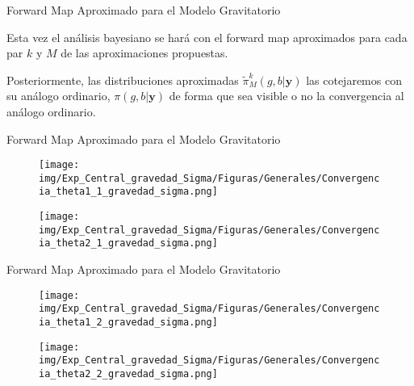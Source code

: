 \documentclass[10pt,aspectratio=169]{beamer}
\begin{document}
\begin{frame}{Forward Map Aproximado para el Modelo Gravitatorio}

  Esta vez el análisis bayesiano se hará con el forward map aproximados para cada par $k$ y $M$ de las aproximaciones propuestas. 
  
  \vspace{0.5 cm}

  Posteriormente, las distribuciones aproximadas $\tilde{\pi}^{k}_M(g,b|\mathbf{y})$ las cotejaremos con su análogo ordinario, $\pi(g,b|\mathbf{y})$ de forma que sea visible o no la convergencia al análogo ordinario.
  
\end{frame}



\begin{frame}{Forward Map Aproximado para el Modelo Gravitatorio}
  \begin{figure}[H] 
    \centering 
    \texttt{[image: img/Exp\_Central\_gravedad\_Sigma/Figuras/Generales/Convergencia\_theta1\_1\_gravedad\_sigma.png]} 
  \end{figure} 
  \begin{figure}[H] 
    \centering 
    \texttt{[image: img/Exp\_Central\_gravedad\_Sigma/Figuras/Generales/Convergencia\_theta2\_1\_gravedad\_sigma.png]} 
    \label{Fig. Aprox grav 3v}
  \end{figure} 
\end{frame}

\begin{frame}{Forward Map Aproximado para el Modelo Gravitatorio}
  \begin{figure}[H] 
    \centering 
    \texttt{[image: img/Exp\_Central\_gravedad\_Sigma/Figuras/Generales/Convergencia\_theta1\_2\_gravedad\_sigma.png]} 
  \end{figure} 
  
  \begin{figure}[H] 
    \centering 
    \texttt{[image: img/Exp\_Central\_gravedad\_Sigma/Figuras/Generales/Convergencia\_theta2\_2\_gravedad\_sigma.png]} 
    \label{Fig. Aprox grav 5v}
  \end{figure} 
\end{frame}
\end{document}
